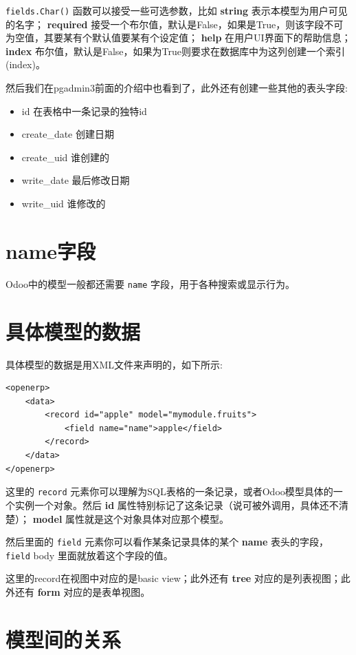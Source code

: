 \documentclass[11pt,a4paper]{sphinxmanual}
\begin{document}
\verb~fields.Char()~ 函数可以接受一些可选参数，比如 \textbf{string} 表示本模型为用户可见的名字； \textbf{required} 接受一个布尔值，默认是False，如果是True，则该字段不可为空值，其要某有个默认值要某有个设定值； \textbf{help} 在用户UI界面下的帮助信息； \textbf{index} 布尔值，默认是False，如果为True则要求在数据库中为这列创建一个索引(index)。

然后我们在pgadmin3前面的介绍中也看到了，此外还有创建一些其他的表头字段:
\begin{itemize}
\item id 在表格中一条记录的独特id
\item create\_date 创建日期
\item create\_uid 谁创建的
\item write\_date 最后修改日期
\item write\_uid 谁修改的
\end{itemize}


\section{name字段}
\label{sec-11-3}
Odoo中的模型一般都还需要 \verb~name~ 字段，用于各种搜索或显示行为。


\section{具体模型的数据}
\label{sec-11-4}
具体模型的数据是用XML文件来声明的，如下所示:
\begin{Verbatim}
<openerp>
    <data>
        <record id="apple" model="mymodule.fruits">
            <field name="name">apple</field>
        </record>
    </data>
</openerp>
\end{Verbatim}

这里的 \verb~record~ 元素你可以理解为SQL表格的一条记录，或者Odoo模型具体的一个实例一个对象。然后 \textbf{id} 属性特别标记了这条记录（说可被外调用，具体还不清楚）； \textbf{model} 属性就是这个对象具体对应那个模型。

然后里面的 \verb~field~ 元素你可以看作某条记录具体的某个 \textbf{name} 表头的字段， \verb~field~ body 里面就放着这个字段的值。

这里的record在视图中对应的是basic view；此外还有 \textbf{tree} 对应的是列表视图；此外还有 \textbf{form} 对应的是表单视图。



\section{模型间的关系}
\label{sec-11-5}
\end{document}
